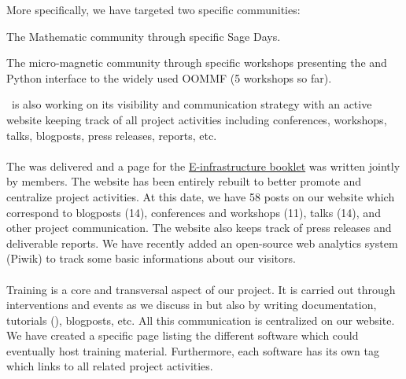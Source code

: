 \documentclass{deliverablereport}
\begin{document}
  More specifically, we have targeted two specific communities:

\begin{compactitem}
\item The Mathematic community through specific Sage Days.
\item The micro-magnetic community through specific workshops presenting
the \Jupyter and Python interface to the widely used OOMMF  (5 workshops so far).
\end{compactitem}  
  

  \ODK\ is also working on its visibility and communication strategy with an active website keeping track of all
  project activities including conferences, workshops, talks, blogposts, press releases, reports, etc.
  
\paragraph{}

The  was delivered and a page for the \href{https://github.com/OpenDreamKit/OpenDreamKit/blob/master/Communication/eInfra-Booklet/ODK.md}{E-infrastructure booklet} was written jointly by \ODK members. The website has been 
entirely rebuilt to better promote  and centralize project activities. At this date, 
we have 58 posts on our website which correspond to blogposts (14), conferences and workshops (11),
talks (14), and other project communication. The website also keeps track of press releases
and deliverable reports. We have recently added an open-source web analytics system (Piwik) 
to track some basic informations about our visitors.

\paragraph{}

Training is a core and transversal aspect of our project. It is carried out 
through interventions and events as we discuss in  but also
by writing documentation, tutorials (), blogposts, etc. All
this communication is centralized on our website. We have created a specific 
page listing the different software which could eventually host training material. Furthermore,
each software has its own tag which links to all related project activities.
\end{document}
